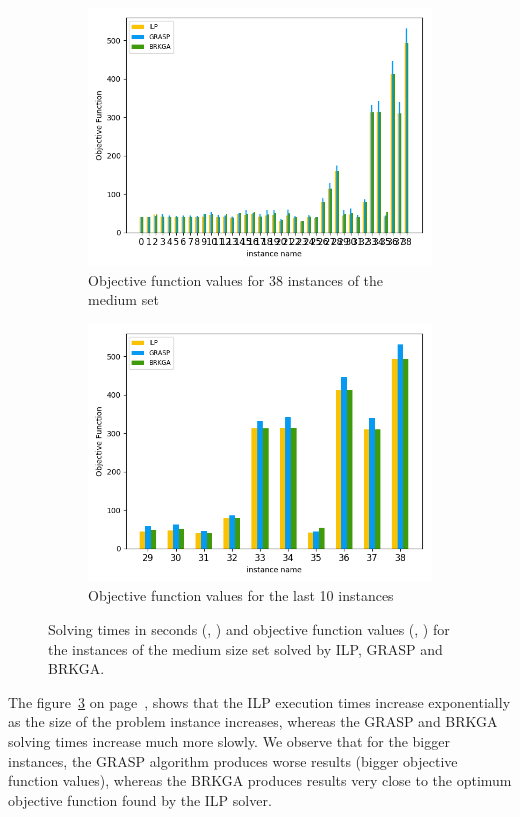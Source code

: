 \begin{figure}[h!]
\begin{subfigure}[b]{.49\linewidth}
\centering
\includegraphics[width=\linewidth]{./img/ILPvsMetah_objf_hist.png}
\caption{Objective function values for 38 instances of the medium set }\label{fig1c}
\end{subfigure}
\begin{subfigure}[b]{.49\linewidth}
\centering
\includegraphics[width=\linewidth]{./img/ILPvsMetah_objf_hist_last10.png}
\caption{Objective function values for the last 10 instances  }\label{fig1d}
\end{subfigure}
\caption{Solving times in seconds (, ) and objective function values (, ) for the instances of the medium size set solved by ILP, GRASP and BRKGA.  }
\label{fig_ilp_vs_meta}
\end{figure}


The figure~\ref{fig_ilp_vs_meta} on page~\pageref{fig_ilp_vs_meta}, shows that the ILP execution times increase exponentially as the size of the problem instance increases, whereas the GRASP and BRKGA solving times increase much more slowly.
We observe that for the bigger instances, the GRASP algorithm produces worse results (bigger objective function values), whereas the BRKGA produces results very close to the optimum objective function found by the ILP solver.
